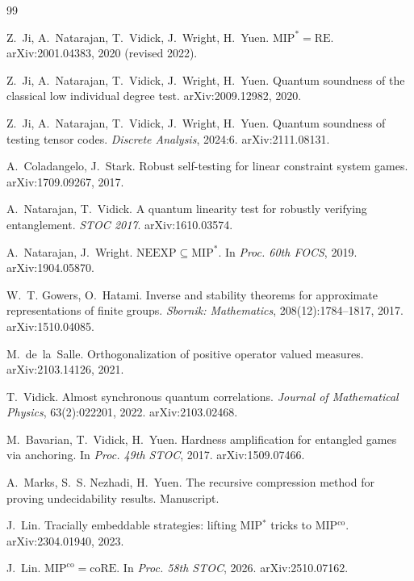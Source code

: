 \begin{thebibliography}{99}

Z.~Ji, A.~Natarajan, T.~Vidick, J.~Wright, H.~Yuen.
\newblock $\mathrm{MIP}^* = \mathrm{RE}$.
\newblock arXiv:2001.04383, 2020 (revised 2022).

Z.~Ji, A.~Natarajan, T.~Vidick, J.~Wright, H.~Yuen.
\newblock Quantum soundness of the classical low individual degree test.
\newblock arXiv:2009.12982, 2020.

Z.~Ji, A.~Natarajan, T.~Vidick, J.~Wright, H.~Yuen.
\newblock Quantum soundness of testing tensor codes.
\newblock \emph{Discrete Analysis}, 2024:6. arXiv:2111.08131.

A.~Coladangelo, J.~Stark.
\newblock Robust self-testing for linear constraint system games.
\newblock arXiv:1709.09267, 2017.

A.~Natarajan, T.~Vidick.
\newblock A quantum linearity test for robustly verifying entanglement.
\newblock \emph{STOC 2017}. arXiv:1610.03574.

A.~Natarajan, J.~Wright.
\newblock $\mathrm{NEEXP} \subseteq \mathrm{MIP}^*$.
\newblock In \emph{Proc. 60th FOCS}, 2019. arXiv:1904.05870.

W.~T. Gowers, O.~Hatami.
\newblock Inverse and stability theorems for approximate representations of finite groups.
\newblock \emph{Sbornik: Mathematics}, 208(12):1784--1817, 2017. arXiv:1510.04085.

M.~de~la~Salle.
\newblock Orthogonalization of positive operator valued measures.
\newblock arXiv:2103.14126, 2021.

T.~Vidick.
\newblock Almost synchronous quantum correlations.
\newblock \emph{Journal of Mathematical Physics}, 63(2):022201, 2022. arXiv:2103.02468.

M.~Bavarian, T.~Vidick, H.~Yuen.
\newblock Hardness amplification for entangled games via anchoring.
\newblock In \emph{Proc. 49th STOC}, 2017. arXiv:1509.07466.

A.~Marks, S.~S. Nezhadi, H.~Yuen.
\newblock The recursive compression method for proving undecidability results.
\newblock Manuscript.

J.~Lin.
\newblock Tracially embeddable strategies: lifting MIP$^*$ tricks to MIP$^{\mathrm{co}}$.
\newblock arXiv:2304.01940, 2023.

J.~Lin.
\newblock $\mathrm{MIP}^{\mathrm{co}} = \mathrm{coRE}$.
\newblock In \emph{Proc. 58th STOC}, 2026. arXiv:2510.07162.


\end{thebibliography}
